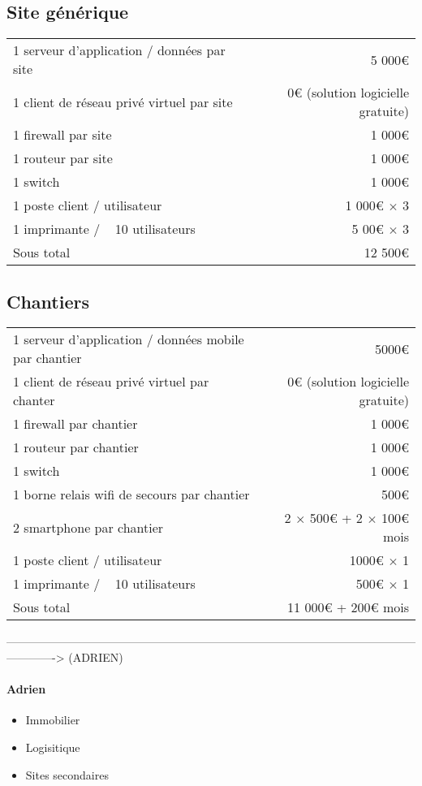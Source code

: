     \subsection{Site générique}
        \begin{tabular*}{\textwidth}{ l @{\extracolsep{\fill}} r }
1 serveur d'application / données par site & 5 000€ \\
1 client de réseau privé virtuel par site & 0€ (solution logicielle gratuite)\\
            1 firewall par site & 1 000€ \\
1 routeur par site & 1 000€ \\
1 switch & 1 000€ \\
1 poste client / utilisateur & 1 000€ $\times$ 3 \\
1 imprimante / ~ 10 utilisateurs & 5 00€ $\times$ 3 \\ \hline
Sous total & 12 500€
        \end{tabular*}

    \subsection{Chantiers}
        \begin{tabular*}{\textwidth}{ l @{\extracolsep{\fill}} r }
1 serveur d'application / données mobile par chantier & 5000€ \\
1 client de réseau privé virtuel par chanter & 0€ (solution logicielle gratuite)\\
1 firewall par chantier & 1 000€ \\
1 routeur par chantier & 1 000€ \\
1 switch & 1 000€ \\
1 borne relais wifi de secours par chantier & 500€ \\
2 smartphone par chantier & 2 $\times$ 500€ + 2 $\times$ 100€ \/ mois\\
1 poste client / utilisateur & 1000€ $\times$ 1 \\
1 imprimante / ~ 10 utilisateurs & 500€ $\times$ 1 \\ \hline
Sous total & 11 000€ + 200€ \/mois
        \end{tabular*}


-------------------------------------------------------------------------------------------------------------------------> (ADRIEN)
        \paragraph{Adrien}
        \begin{itemize}
            \item Immobilier
            \item Logisitique
            \item Sites secondaires
        \end{itemize}
        
